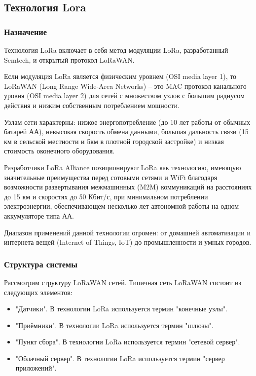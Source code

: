 \subsection{Технология Lora}
\subsubsection{Назначение}
Технология LoRa включает в себя метод модуляции LoRa, разработанный Semtech, и открытый протокол LoRaWAN.

Если модуляция LoRa является физическим уровнем (OSI media layer 1), то LoRaWAN (Long Range Wide-Area Networks) – это MAC протокол канального уровня (OSI media layer 2) для сетей с множеством узлов с большим радиусом действия и низким собственным потреблением мощности.   

Узлам сети характерны: низкое энергопотребление (до 10 лет работы от обычных батарей АА), невысокая скорость обмена данными, большая дальность связи (15 км в сельской местности и 5км в плотной городской застройке) и низкая стоимость оконечного оборудования.

Разработчики LoRa Alliance позиционируют LoRa как технологию, имеющую значительные преимущества перед сотовыми сетями и WiFi благодаря возможности развертывания межмашинных (M2M) коммуникаций на расстояниях до 15 км и скоростях до 50 Кбит/с, при минимальном потреблении электроэнергии, обеспечивающем несколько лет автономной работы на одном аккумуляторе типа АА.

Диапазон применений данной технологии огромен: от домашней автоматизации и интернета вещей (Internet of Things, IoT) до промышленности и умных городов.

\subsubsection{Структура системы}
Рассмотрим структуру LoRaWAN сетей. Типичная сеть LoRaWAN состоит из следующих элементов: 
\begin{itemize}
	\item"Датчики". В технологии LoRa используется термин "конечные узлы".
	\item"Приёмники". В технологии LoRa используется термин "шлюзы".
	\item"Пункт сбора". В технологии LoRa используется термин "сетевой сервер".
	\item"Облачный сервер". В технологии LoRa используется термин "сервер приложений".
\end{itemize}

